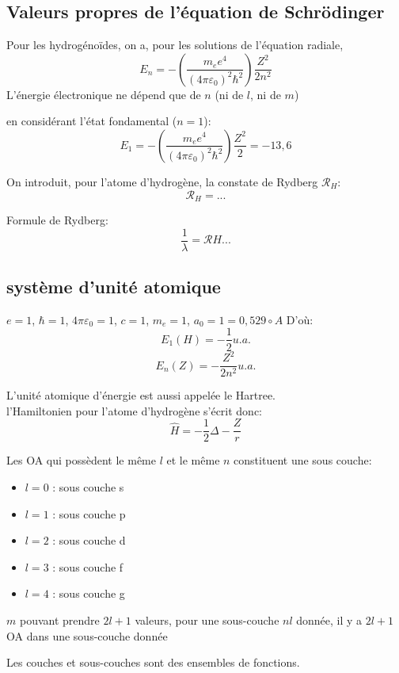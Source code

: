 \documentclass[../main.tex]{subfile}
\begin{document}
	\subsection{Valeurs propres de l'équation de Schrödinger}
	Pour les hydrogénoïdes, on a, pour les solutions de l'équation radiale, 
	$$E_n = - (\frac{m_e e^4}{(4\pi\varepsilon_0)^2\hbar^2}) \frac{Z^2}{2n^2}$$
	L'énergie électronique ne dépend que de $n$ (ni de $l$, ni de $m$)

	en considérant l'état fondamental ($n=1$):
	$$E_1 = - (\frac{m_e e^4}{(4\pi\varepsilon_0)^2\hbar^2}) \frac{Z^2}{2} = - 13,6$$


	On introduit, pour l'atome d'hydrogène, la constate de Rydberg $\mathcal{R}_H$:
	$$\mathcal{R}_H = ...$$

	Formule de Rydberg:
	$$\frac{1}{\lambda} = \mathcal{R}H ...$$

	\subsection{système d'unité atomique}
	$e=1$, $\hbar = 1$, $4\pi\varepsilon_0 = 1$, $c=1$, $m_e = 1$, $a_0 = 1 = 0,529 \circ{A}$
	D'où:
	$$E_1(H) = -\frac{1}{2} u.a.$$
	$$E_n(Z) = -\frac{Z^2}{2n^2} u.a.$$

	L'unité atomique d'énergie est aussi appelée le Hartree.\\

	l'Hamiltonien pour l'atome d'hydrogène s'écrit donc:
	$$\hat{H} = -\frac{1}{2} \Delta - \frac{Z}{r}$$






	Les OA qui possèdent le même $l$ et le même $n$ constituent une sous couche:
\begin{itemize}	
	\item $l=0$ : sous couche s
	\item $l=1$ : sous couche p
	\item $l=2$ : sous couche d
	\item $l=3$ : sous couche f
	\item $l=4$ : sous couche g
\end{itemize}
	$m$ pouvant prendre $2l+1$ valeurs, pour une sous-couche $nl$ donnée, il y a $2l+1$ OA dans une sous-couche donnée

	Les couches et sous-couches sont des ensembles de fonctions.
\end{document}
